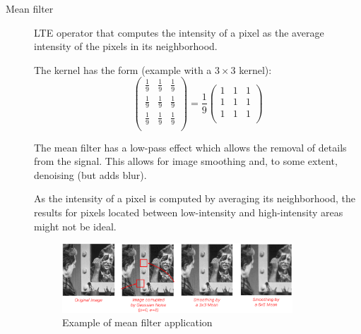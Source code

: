 \begin{description}
    \item[Mean filter] 
        LTE operator that computes the intensity of a pixel as the average intensity of the pixels in its neighborhood.

        The kernel has the form (example with a $3 \times 3$ kernel):
        \[
            \begin{pmatrix}
                \frac{1}{9} & \frac{1}{9} & \frac{1}{9} \\
                \frac{1}{9} & \frac{1}{9} & \frac{1}{9} \\
                \frac{1}{9} & \frac{1}{9} & \frac{1}{9} \\
            \end{pmatrix} 
            = 
            \frac{1}{9} \begin{pmatrix}
                1 & 1 & 1 \\
                1 & 1 & 1 \\
                1 & 1 & 1 \\
            \end{pmatrix} 
        \]

        \begin{remark}
            The mean filter has a low-pass effect which allows the removal of details from the signal.
            This allows for image smoothing and, to some extent, denoising (but adds blur).
        \end{remark}
        \begin{remark}
            As the intensity of a pixel is computed by averaging its neighborhood, 
            the results for pixels located between low-intensity and high-intensity areas might not be ideal.
        \end{remark}

        \begin{figure}[H]
            \centering
            \includegraphics[width=0.85\textwidth]{./img/_mean_filter_example.pdf}
            \caption{Example of mean filter application}
        \end{figure}


\end{description}
